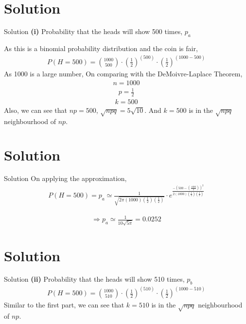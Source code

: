 \documentclass{beamer}
\begin{document}
\section{Solution}
\begin{frame}{Solution}
    \textbf{(i)} Probability that the heads will show 500 times, {$p_a$}
    
    As this is a binomial probability distribution and the coin is fair,
    \begin{align}
        P(H = 500) = {1000 \choose 500} \cdot (\frac{1}{2})^{(500)} \cdot (\frac{1}{2})^{(1000-500)}
    \end{align}
    As 1000 is a large number, On comparing with the DeMoivre-Laplace Theorem,
    \begin{align}
        n = 1000
    \end{align}
    \begin{align}
        p = \frac{1}{2}
    \end{align}
    \begin{align}
        k = 500
    \end{align}
    Also, we can see that $np = 500$, $\sqrt{npq} = 5\sqrt{10}$. And $k = 500$ is in the $\sqrt{npq}$ neighbourhood of $np$.
\end{frame}

\section{Solution}
\begin{frame}{Solution}
    On applying the approximation,
    \begin{align}
            P(H = 500) = p_a \simeq \frac{1}{\sqrt{2 \pi (1000)(\frac{1}{2})(\frac{1}{2})}} \cdot e^{\frac{-(500-(\frac{1000}{2}))^2}{2(1000)(\frac{1}{2})(\frac{1}{2})}}
    \end{align}

\begin{align}
    \Rightarrow \boxed{p_a \simeq \frac{1}{10 \sqrt{5 \pi}} = 0.0252}
\end{align}
\end{frame}

\section{Solution}
\begin{frame}{Solution}
   \textbf{(ii)} Probability that the heads will show 510 times, $p_b$
   \begin{align}
       P(H = 500) = {1000 \choose 510} \cdot (\frac{1}{2})^{(510)} \cdot (\frac{1}{2})^{(1000- 510)}
   \end{align}
    Similar to the first part, we can see that $k = 510$ is in the $\sqrt{npq}$ neighbourhood of $np$.
\end{frame}
\end{document}
